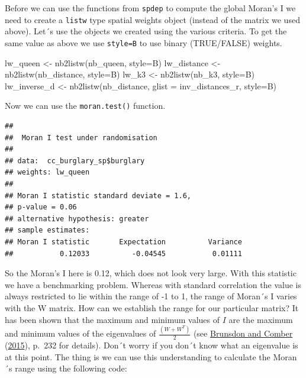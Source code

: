 \documentclass[
  krantz2]{krantz}
\makeatletter
\newenvironment{Shaded}{\begin{snugshade}}{\end{snugshade}}
\newcommand{\AttributeTok}[1]{\textcolor[rgb]{0.61,0.61,0.61}{#1}}
\newcommand{\FunctionTok}[1]{\textcolor[rgb]{0,0,0}{#1}}
\newcommand{\NormalTok}[1]{#1}
\newcommand{\OtherTok}[1]{\textcolor[rgb]{0.37,0.37,0.37}{#1}}
\newcommand{\SpecialCharTok}[1]{\textcolor[rgb]{0,0,0}{#1}}
\newcommand{\StringTok}[1]{\textcolor[rgb]{0.5,0.5,0.5}{#1}}
\newenvironment{kframe}{%
\medskip{}
\setlength{\fboxsep}{.8em}
 \def\at@end@of@kframe{}%
 \ifinner\ifhmode%
  \def\at@end@of@kframe{\end{minipage}}%
  \begin{minipage}{\columnwidth}%
 \fi\fi%
 \def\FrameCommand##1{\hskip\@totalleftmargin \hskip-\fboxsep
 \colorbox{shadecolor}{##1}\hskip-\fboxsep
     \hskip-\linewidth \hskip-\@totalleftmargin \hskip\columnwidth}%
 \MakeFramed {\advance\hsize-\width
   \@totalleftmargin\z@ \linewidth\hsize
   \@setminipage}}%
 {\par\unskip\endMakeFramed%
 \at@end@of@kframe}
\renewenvironment{Shaded}{\begin{kframe}}{\end{kframe}}
\makeatother
\begin{document}
Before we can use the functions from \texttt{spdep} to compute the global Moran's I we need to create a \texttt{listw} type spatial weights object (instead of the matrix we used above). Let´s use the objects we created using the various criteria. To get the same value as above we use \texttt{style=\textquotesingle{}B\textquotesingle{}} to use binary (TRUE/FALSE) weights.

\begin{Shaded}
\begin{Highlighting}[]
\NormalTok{lw\_queen }\OtherTok{\textless{}{-}}  \FunctionTok{nb2listw}\NormalTok{(nb\_queen, }\AttributeTok{style=}\StringTok{\textquotesingle{}B\textquotesingle{}}\NormalTok{)}
\NormalTok{lw\_distance }\OtherTok{\textless{}{-}} \FunctionTok{nb2listw}\NormalTok{(nb\_distance, }\AttributeTok{style=}\StringTok{\textquotesingle{}B\textquotesingle{}}\NormalTok{)}
\NormalTok{lw\_k3 }\OtherTok{\textless{}{-}} \FunctionTok{nb2listw}\NormalTok{(nb\_k3, }\AttributeTok{style=}\StringTok{\textquotesingle{}B\textquotesingle{}}\NormalTok{)}
\NormalTok{lw\_inverse\_d }\OtherTok{\textless{}{-}} \FunctionTok{nb2listw}\NormalTok{(nb\_distance,}
                \AttributeTok{glist =}\NormalTok{ inv\_distances\_r,}
                \AttributeTok{style=}\StringTok{\textquotesingle{}B\textquotesingle{}}\NormalTok{)}
\end{Highlighting}
\end{Shaded}

Now we can use the \texttt{moran.test()} function.

\begin{Shaded}
\end{Shaded}

\begin{verbatim}
## 
##  Moran I test under randomisation
## 
## data:  cc_burglary_sp$burglary  
## weights: lw_queen    
## 
## Moran I statistic standard deviate = 1.6,
## p-value = 0.06
## alternative hypothesis: greater
## sample estimates:
## Moran I statistic       Expectation          Variance 
##           0.12033          -0.04545           0.01111
\end{verbatim}

So the Moran's I here is 0.12, which does not look very large. With this statistic we have a benchmarking problem. Whereas with standard correlation the value is always restricted to lie within the range of -1 to 1, the range of Moran´s I varies with the W matrix. How can we establish the range for our particular matrix? It has been shown that the maximum and minimum values of \(I\) are the maximum and minimum values of the eigenvalues of \(\frac{(W + W^T)}{2}\) (see \protect\hyperlink{ref-Brunsdon_2015}{Brunsdon and Comber} (\protect\hyperlink{ref-Brunsdon_2015}{2015}), p.~232 for details). Don´t worry if you don´t know what an eigenvalue is at this point. The thing is we can use this understanding to calculate the Moran´s range using the following code:
\end{document}
